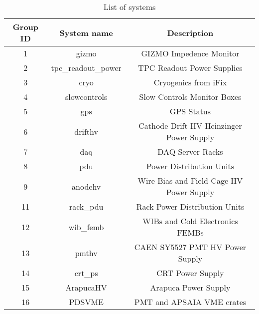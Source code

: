 
\begin{table}[ptb]
\centering
\begin{tabular}{c | c c}
\hline
Group ID & System name & Description \\ 

\hline
1 & gizmo & GIZMO Impedence Monitor\\ 
2 & tpc\_readout\_power & TPC Readout Power Supplies\\ 
3 & cryo & Cryogenics from iFix\\ 
4 & slowcontrols & Slow Controls Monitor Boxes\\ 
5 & gps & GPS Status\\ 
6 & drifthv & Cathode Drift HV Heinzinger Power Supply\\ 
7 & daq & DAQ Server Racks\\ 
8 & pdu & Power Distribution Units\\ 
9 & anodehv & Wire Bias and Field Cage HV Power Supply\\ 
11 & rack\_pdu & Rack Power Distribution Units\\ 
12 & wib\_femb & WIBs and Cold Electronics FEMBs\\ 
13 & pmthv & CAEN SY5527 PMT HV Power Supply\\ 
14 & crt\_ps & CRT Power Supply\\ 
15 & ArapucaHV & Arapuca Power Supply\\ 
16 & PDSVME & PMT and APSAIA VME crates\\ 

\hline
\end{tabular}
\caption{List of systems}
\label{tab:system_list}
\end{table}

